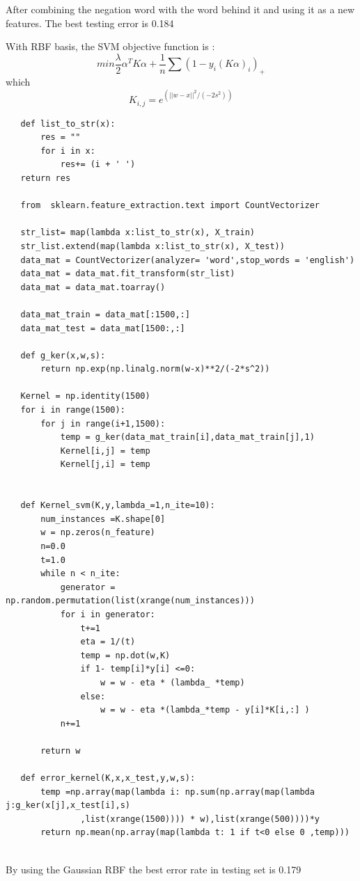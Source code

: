 \documentclass{article}
\newenvironment{sub}[2][$-$]{\begin{trivlist}
		\item[\hskip \labelsep {\bfseries #1}\hskip \labelsep {\bfseries #2.}]}  {\end{trivlist}}
\begin{document}
After combining the negation word with the word behind it and using it as a new features. The best testing error is 0.184

\begin{sub}{8.3 RBF with Gaussian Kernel}
\end{sub}

With RBF basis, the SVM objective function is :
$$min \frac{\lambda}{2} \alpha^TK\alpha +\frac{1}{n}  \sum (1 - y_i(K\alpha)_i)_+$$
which $$K_{i,j} =  e^{(||w-x||^2/(-2s^2))}$$ 
\begin{verbatim}
   def list_to_str(x):
	   res = ""
	   for i in x:
		   res+= (i + ' ')
   return res
   
   from  sklearn.feature_extraction.text import CountVectorizer
   
   str_list= map(lambda x:list_to_str(x), X_train)
   str_list.extend(map(lambda x:list_to_str(x), X_test))
   data_mat = CountVectorizer(analyzer= 'word',stop_words = 'english')
   data_mat = data_mat.fit_transform(str_list)
   data_mat = data_mat.toarray()
   
   data_mat_train = data_mat[:1500,:]
   data_mat_test = data_mat[1500:,:]
   
   def g_ker(x,w,s):
	   return np.exp(np.linalg.norm(w-x)**2/(-2*s^2))
   
   Kernel = np.identity(1500)
   for i in range(1500):
	   for j in range(i+1,1500):
		   temp = g_ker(data_mat_train[i],data_mat_train[j],1)
		   Kernel[i,j] = temp
		   Kernel[j,i] = temp
   
   
   def Kernel_svm(K,y,lambda_=1,n_ite=10):
	   num_instances =K.shape[0]
	   w = np.zeros(n_feature)
	   n=0.0
	   t=1.0
	   while n < n_ite:
		   generator = np.random.permutation(list(xrange(num_instances))) 
		   for i in generator:
			   t+=1
			   eta = 1/(t)
			   temp = np.dot(w,K)
			   if 1- temp[i]*y[i] <=0:
				   w = w - eta * (lambda_ *temp)
			   else:
				   w = w - eta *(lambda_*temp - y[i]*K[i,:] )
		   n+=1
   
	   return w
   
   def error_kernel(K,x,x_test,y,w,s):
	   temp =np.array(map(lambda i: np.sum(np.array(map(lambda j:g_ker(x[j],x_test[i],s)
			   ,list(xrange(1500)))) * w),list(xrange(500))))*y
	   return np.mean(np.array(map(lambda t: 1 if t<0 else 0 ,temp)))
   

\end{verbatim}

By using the Gaussian RBF the best error rate in testing set is 0.179
\end{document}
